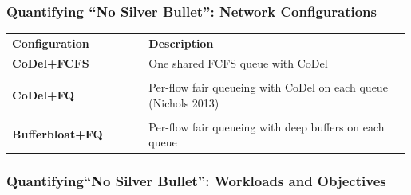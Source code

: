 \begin{Large}
\begin{frame}[plain]
\frametitle{Quantifying ``No Silver Bullet'': Network Configurations}
\begin{table}
\begin{tabular}{|p{0.34\linewidth}|p{0.65\linewidth}|}
\hline
{\bf \underline{Configuration}} & {\bf \underline{Description}} \\
{\bf CoDel+FCFS} & One shared FCFS queue with CoDel\\
& \\
{\bf CoDel+FQ} & Per-flow fair queueing with CoDel on each queue (Nichols 2013)\\ 
&\\
{\bf Bufferbloat+FQ} & Per-flow fair queueing with deep buffers on
each queue\\ 
\hline
\end{tabular}
\end{table}
\end{frame}

\begin{frame}[plain]
\frametitle{Quantifying``No Silver Bullet'': Workloads and Objectives}


\end{frame}
\end{Large}
